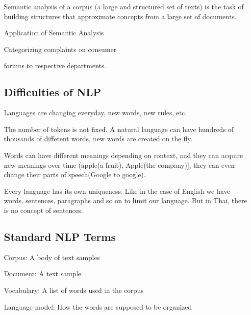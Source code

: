 \begin{bulletedlist}
		\begin{bulletedlist}
			\item Semantic analysis of a corpus (a large and structured set of texts) is the task of building structures that approximate concepts from a large set of documents.
			\item Application of Semantic Analysis
			\begin{bulletedlist}
				\item
				\begin{bulletedlist}
					\item Categorizing complaints on consumer
					\item forums to respective departments.
				\end{bulletedlist}
			\end{bulletedlist}
		\end{bulletedlist}
	\end{bulletedlist}

	\subsection{Difficulties of NLP}
	\begin{bulletedlist}
		\item Languages are changing everyday, new words, new rules, etc.
		\item The number of tokens is not fixed. A natural language can have hundreds of thousands of different words, new words are created on the fly.
		\item Words can have different meanings depending on context, and they can acquire new meanings over time (apple(a fruit), Apple(the company)], they can even change their parts of speech(Google to google).
		\item Every language has its own uniqueness. Like in the case of English we have words, sentences, paragraphs and so on to limit our language. But in Thai, there is no concept of sentences.
	\end{bulletedlist}

	\subsection{Standard NLP Terms}
	\begin{bulletedlist}
		\item Corpus: A body of text samples
		\item Document: A text sample
		\item Vocabulary: A list of words used in the corpus
		\item Language model: How the words are supposed to be organized
	\end{bulletedlist}

